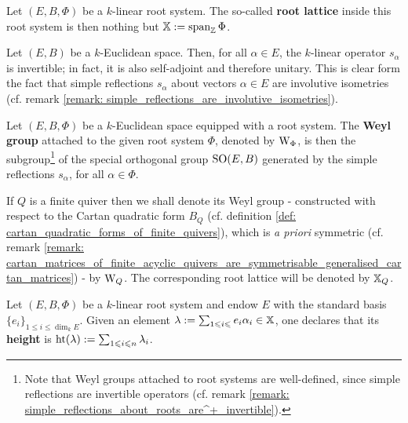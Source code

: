             \begin{definition} \label{def: abstract_root_lattices}
                Let $(E,B, \Phi)$ be a $k$-linear root system. The so-called \textbf{root lattice} inside this root system is then nothing but $\mathbb{X} := \operatorname{span}_{\mathbb{Z}} \Phi$. 
            \end{definition}
            \begin{remark} \label{remark: simple_reflections_about_roots_are^+_invertible}
                Let $(E, B)$ be a $k$-Euclidean space. Then, for all $\alpha \in E$, the $k$-linear operator $s_{\alpha}$ is invertible; in fact, it is also self-adjoint and therefore unitary. This is clear form the fact that simple reflections $s_{\alpha}$ about vectors $\alpha \in E$ are involutive isometries (cf. remark \ref{remark: simple_reflections_are_involutive_isometries}).
            \end{remark}
            \begin{definition} \label{def: weyl_groups}
                Let $(E,B, \Phi)$ be a $k$-Euclidean space equipped with a root system. The \textbf{Weyl group} attached to the given root system $\Phi$, denoted by $\mathrm{W}_{\Phi}$, is then the subgroup\footnote{Note that Weyl groups attached to root systems are well-defined, since simple reflections are invertible operators (cf. remark \ref{remark: simple_reflections_about_roots_are^+_invertible}).} of the special orthogonal group $\mathrm{SO}(E, B)$ generated by the simple reflections $s_{\alpha}$, for all $\alpha \in \Phi$.
            \end{definition}
            \begin{convention} \label{conv: weyl_groups_of_finite_quivers}
                If $Q$ is a finite quiver then we shall denote its Weyl group - constructed with respect to the Cartan quadratic form $B_Q$ (cf. definition \ref{def: cartan_quadratic_forms_of_finite_quivers}), which is \textit{a priori} symmetric (cf. remark \ref{remark: cartan_matrices_of_finite_acyclic_quivers_are_symmetrisable_generalised_cartan_matrices}) - by $\mathrm{W}_Q$. The corresponding root lattice will be denoted by $\mathbb{X}_Q$.
            \end{convention}
            \begin{definition} \label{def: heights_of_roots}
                Let $(E, B, \Phi)$ be a $k$-linear root system and endow $E$ with the standard basis $\{e_i\}_{1 \leq i \leq \dim_k E}$. Given an element $\lambda := \sum_{1 \leqslant i \leqslant } e_i \alpha_i \in \mathbb{X}$, one declares that its \textbf{height} is $\operatorname{ht}(\lambda) := \sum_{1 \leqslant i \leqslant n} \lambda_i$. 
            \end{definition}
